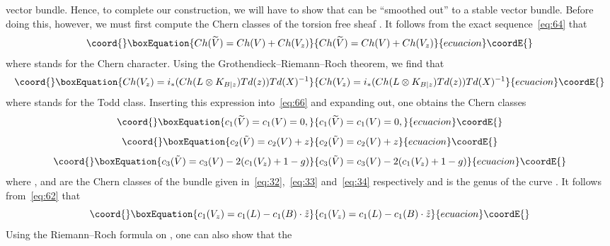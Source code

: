 \documentclass[a4paper,12pt]{article}
\numberwithin{equation}{section}
\theoremstyle{plain}
\begin{document}
vector bundle. Hence, to complete our construction, we will have to show that
\coordHE{} can be ``smoothed out'' to a stable vector bundle. Before
doing this, however, we must first compute the Chern classes of the
torsion free sheaf \coordHE{}. It follows from the exact
sequence~\eqref{eq:64} that
\begin{equation}\coord{}\boxEquation{
Ch(\widetilde{V})=Ch(V) + Ch(V_{z})
\label{eq:66}
}{
Ch(\widetilde{V})=Ch(V) + Ch(V_{z})
}{ecuacion}\coordE{}\end{equation}
where \coordHE{} stands for the Chern character. Using the
Grothendieck--Riemann--Roch theorem, we find that
\begin{equation}\coord{}\boxEquation{
Ch(V_{z})=i_{*}(Ch(L\otimes K_{B|z})Td(z))Td(X)^{-1}
\label{eq:67}
}{
Ch(V_{z})=i_{*}(Ch(L\otimes K_{B|z})Td(z))Td(X)^{-1}
}{ecuacion}\coordE{}\end{equation}
where \coordHE{} stands for the Todd class. Inserting this expression
into~\eqref{eq:66} and expanding out, one obtains the Chern classes
\begin{equation}\coord{}\boxEquation{
c_{1}(\widetilde{V})=c_{1}(V)=0,
\label{eq:68}
}{
c_{1}(\widetilde{V})=c_{1}(V)=0,
}{ecuacion}\coordE{}\end{equation}
\begin{equation}\coord{}\boxEquation{
c_{2}(\tilde{V})=c_{2}(V) +z
\label{eq:69}
}{
c_{2}(\tilde{V})=c_{2}(V) +z
}{ecuacion}\coordE{}\end{equation}
\begin{equation}\coord{}\boxEquation{
c_{3}(\tilde{V})=c_{3}(V)-2(c_{1}(V_{z})+1-g)
\label{eq:70}
}{
c_{3}(\tilde{V})=c_{3}(V)-2(c_{1}(V_{z})+1-g)
}{ecuacion}\coordE{}\end{equation}
where \coordHE{},\coordHE{} and \coordHE{} are the Chern classes of the bundle
\coordHE{} given in~\eqref{eq:32},~\eqref{eq:33} and~\eqref{eq:34} respectively
and \coordHE{} is the genus of the curve \coordHE{}.
It follows from~\eqref{eq:62} that
\begin{equation}\coord{}\boxEquation{
c_{1}(V_{z})=c_{1}(L) -c_{1}(B) \cdot \tilde{z}
\label{eq:71A}
}{
c_{1}(V_{z})=c_{1}(L) -c_{1}(B) \cdot \tilde{z}
}{ecuacion}\coordE{}\end{equation}
Using the Riemann--Roch formula on \coordHE{}, one can also show that the
\end{document}
